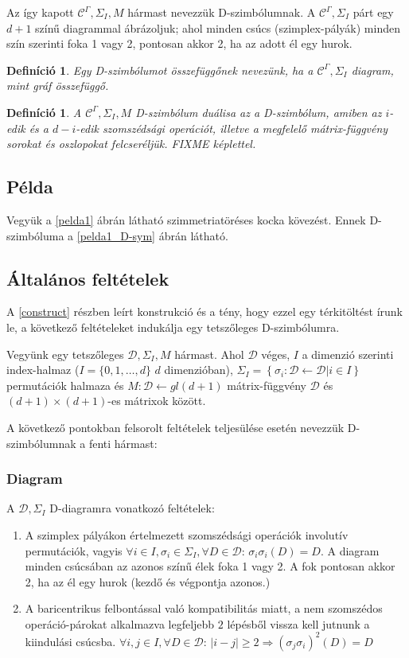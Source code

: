 \documentclass[12pt,magyar,a4paper]{article}
\newtheorem{defn}[thm]{Definíció}
\begin{document}
Az így kapott $\mathcal{C}^\Gamma, \Sigma_I, M$ hármast nevezzük D-szimbólumnak. A
$\mathcal{C}^\Gamma, \Sigma_I$ párt egy $d+1$ színű diagrammal ábrázoljuk; ahol
minden csúcs (szimplex-pályák) minden szín szerinti foka 1 vagy 2, pontosan
akkor 2, ha az adott él egy hurok.

\begin{defn}
  Egy D-szimbólumot összefüggőnek nevezünk, ha a $\mathcal{C}^\Gamma, \Sigma_I$
  diagram, mint gráf összefüggő.
\end{defn}

\begin{defn}
  A $\mathcal{C}^\Gamma, \Sigma_I, M$ D-szimbólum duálisa az a D-szimbólum,
  amiben az $i$-edik és a $d-i$-edik szomszédsági operációt, illetve a
  megfelelő mátrix-függvény sorokat és oszlopokat felcseréljük. FIXME képlettel.
\end{defn}

\subsection{Példa}
Vegyük a \ref{pelda1} ábrán látható szimmetriatöréses kocka kövezést. Ennek
D-szimbóluma a \ref{pelda1_D-sym} ábrán látható.

\subsection{Általános feltételek}
A \ref{construct} részben leírt konstrukció és a tény, hogy ezzel egy
térkitöltést írunk le, a következő feltételeket indukálja egy tetszőleges
D-szimbólumra.

Vegyünk egy tetszőleges $\mathcal{D}, \Sigma_I, M$ hármast. Ahol $\mathcal{D}$
véges, $I$ a dimenzió szerinti index-halmaz ($I=\{0,1,\ldots,d\}$ $d$
dimenzióban),
$\Sigma_I=\left\{\sigma_i:\mathcal{D}\leftarrow\mathcal{D}\left|i\in
I\right.\right\}$ permutációk halmaza és $M: \mathcal{D} \leftarrow gl(d+1)$
mátrix-függvény $\mathcal{D}$ és $(d+1)\times(d+1)$-es mátrixok között.

A következő pontokban felsorolt feltételek teljesülése esetén nevezzük
D-szimbólumnak a fenti hármast:
\subsubsection{Diagram}
A $\mathcal{D}, \Sigma_I$ D-diagramra vonatkozó feltételek:
\begin{enumerate}
  \item A szimplex pályákon értelmezett szomszédsági operációk involutív
    permutációk, vagyis $\forall i\in I, \sigma_i\in \Sigma_I, \forall D\in
    \mathcal{D}$: $\sigma_i\sigma_i(D)=D$. A diagram minden csúcsában az azonos
    színű élek foka 1 vagy 2. A fok pontosan akkor 2, ha az él egy hurok (kezdő
    és végpontja azonos.)
  \item A baricentrikus felbontással való kompatibilitás miatt, a nem szomszédos
    operáció-párokat alkalmazva legfeljebb $2$ lépésből vissza kell jutnunk a
    kiindulási csúcsba. $\forall i,j\in I, \forall D\in \mathcal{D}$: $|i-j|\geq
    2 \Rightarrow (\sigma_j\sigma_i)^2(D)=D$
\end{enumerate}
\end{document}
